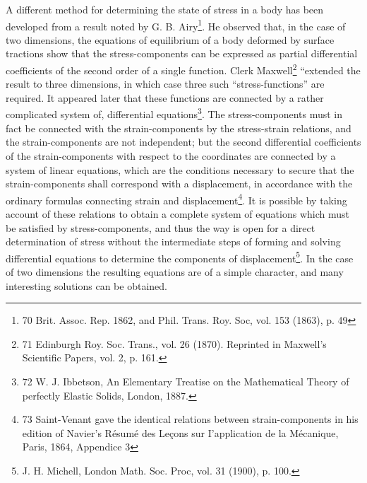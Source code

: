 A different method for determining the state of stress in a body
has been developed from a result noted by G. B.
Airy\footnote{70 Brit. Assoc. Rep. 1862, and Phil. Trans. Roy. Soc, vol. 153
(1863), p. 49}.  He observed that, in the case
of two dimensions, the equations of equilibrium of a body deformed by surface
tractions show that the stress-components can be expressed as partial differential
coefficients of the second order of a single function.
Clerk Maxwell\footnote{71 Edinburgh Roy. Soc. Trans., vol. 26 (1870). Reprinted in Maxwell's
Scientific Papers, vol. 2, p. 161.} ``extended the
result to three dimensions, in which case three such ``stress-functions'' are
required. It appeared later that these functions are connected by a rather
complicated system of, differential equations\footnote{72 W. J. Ibbetson, An Elementary
Treatise on the Mathematical Theory of
perfectly Elastic Solids, London, 1887.}. The stress-components must
in fact be connected with the strain-components by the stress-strain relations,
and the strain-components are not independent; but the second differential
coefficients of the strain-components with respect to the coordinates are
connected by a system of linear equations, which are the conditions necessary to
secure that the strain-components shall correspond with a displacement, in
accordance with the ordinary formulas connecting strain and
displacement\footnote{73 Saint-Venant gave the identical relations between
strain-components in his edition of Navier's Résumé des Leçons sur I'application
de la Mécanique, Paris, 1864, Appendice 3}.
It is possible by taking account of these relations to obtain a complete system
of equations which must be satisfied by stress-components, and thus the way
is open for a direct determination of stress without the intermediate steps of
forming and solving differential equations to determine the components of
displacement\footnote{J. H. Michell, London Math. Soc. Proc, vol. 31 (1900), p. 100.}.
In the case of two dimensions the resulting equations are of a
simple character, and many interesting solutions can be obtained.


